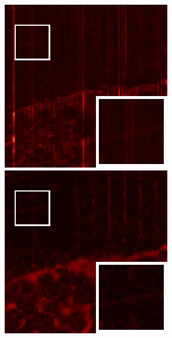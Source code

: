 \begin{figure}[t]
\begin{center}
\begin{minipage}{0.15\hsize}
		\end{minipage}
		\begin{minipage}{0.15\hsize}
			\centerline{\includegraphics[width=\hsize]{./fig_supplement/SAM_map_color_woboundary/Beltsville/sam_map_FastHyMix.eps}} %
		\end{minipage}
		\begin{minipage}{0.15\hsize}
			\centerline{\includegraphics[width=\hsize]{./fig_supplement/SAM_map_color_woboundary/Beltsville/sam_map_S3TTV.eps}} %

\end{minipage}
\end{center}
\end{figure}
